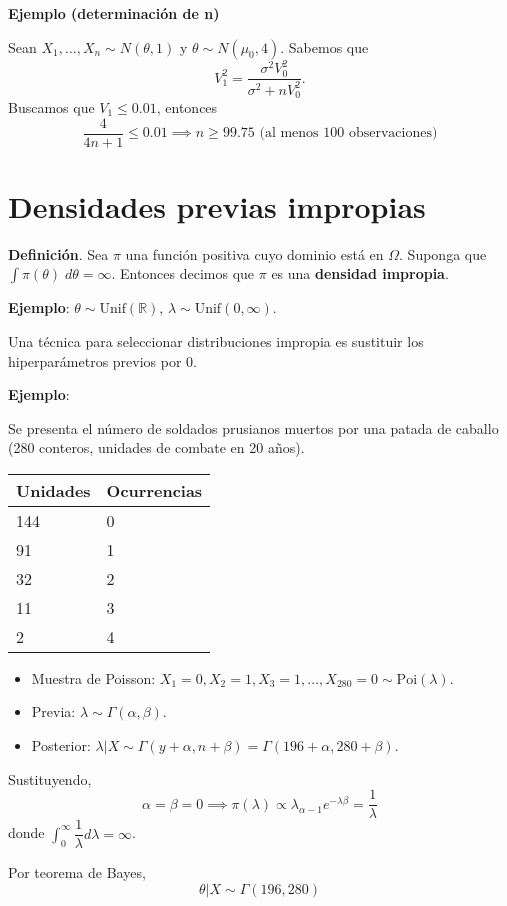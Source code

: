 \documentclass[
  12pt,
]{book}
\begin{document}
\textbf{Ejemplo (determinación de n)}

Sean \(X_1,\dots, X_n \sim N(\theta,1)\) y \(\theta\sim N(\mu_0,4)\). Sabemos que \[V_1^2 = \dfrac{\sigma^2V_0^2}{\sigma^2 + nV_0^2}. \]
Buscamos que \(V_1\leq 0.01\), entonces
\[ \dfrac{4}{4n+1}\leq 0.01 \implies n\geq 99.75 \text{ (al menos 100 observaciones)}\]

\hypertarget{densidades-previas-impropias}{%
\section{Densidades previas impropias}\label{densidades-previas-impropias}}

\textbf{Definición}. Sea \(\pi\) una función positiva cuyo dominio está en \(\Omega\). Suponga que \(\int\pi(\theta)\;d\theta = \infty\). Entonces decimos que \(\pi\) es una \textbf{densidad impropia}.

\textbf{Ejemplo}: \(\theta \sim \text{Unif}(\mathbb{R})\), \(\lambda \sim \text{Unif}(0,\infty)\).

Una técnica para seleccionar distribuciones impropia es sustituir los hiperparámetros previos por 0.

\textbf{Ejemplo}:

Se presenta el número de soldados prusianos muertos por una patada de caballo (280 conteros, unidades de combate en 20 años).

\begin{longtable}[]{@{}ll@{}}
\toprule
Unidades & Ocurrencias\tabularnewline
\midrule
\endhead
144 & 0\tabularnewline
91 & 1\tabularnewline
32 & 2\tabularnewline
11 & 3\tabularnewline
2 & 4\tabularnewline
\bottomrule
\end{longtable}

\begin{itemize}
\item
  Muestra de Poisson: \(X_1 = 0, X_2 = 1, X_3 = 1,\dots, X_{280} = 0 \sim \text{Poi}(\lambda)\).
\item
  Previa: \(\lambda \sim \Gamma(\alpha, \beta)\).
\item
  Posterior: \(\lambda|X \sim \Gamma(y+\alpha, n+\beta) = \Gamma(196 + \alpha, 280 + \beta)\).
\end{itemize}

Sustituyendo,
\[\alpha=\beta = 0 \implies \pi(\lambda) \propto \lambda_{\alpha-1}e^{-\lambda\beta} = \dfrac{1}{\lambda}\]
donde \(\displaystyle\int_{0}^{\infty}\dfrac{1}{\lambda} d\lambda = \infty\).

Por teorema de Bayes, \[\theta|X \sim \Gamma(196,280)\]
\end{document}
